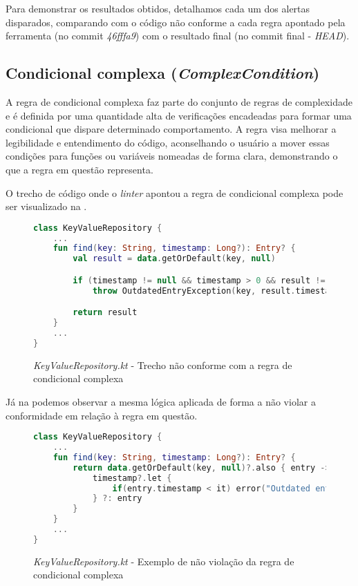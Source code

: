 Para demonstrar os resultados obtidos, detalhamos cada um dos alertas disparados, comparando com o código não conforme a cada regra apontado pela ferramenta (no commit \textit{46fffa9}) com o resultado final (no commit final - \textit{HEAD}).

\subsection{Condicional complexa (\textit{ComplexCondition})}

A regra de condicional complexa faz parte do conjunto de regras de complexidade e é definida por uma quantidade alta de verificações encadeadas para formar uma condicional que dispare determinado comportamento. A regra visa melhorar a legibilidade e entendimento do código, aconselhando o usuário a mover essas condições para funções ou variáveis nomeadas de forma clara, demonstrando o que a regra em questão representa\cite{detekt_complex_condition_rule}.

O trecho de código onde o \textit{linter} apontou a regra de condicional complexa pode ser visualizado na .

\begin{figure}[H]
    \centering
    \begin{lstlisting}[language=Kotlin]
class KeyValueRepository {
    ...
    fun find(key: String, timestamp: Long?): Entry? {
        val result = data.getOrDefault(key, null)

        if (timestamp != null && timestamp > 0 && result != null && result.timestamp < timestamp)
            throw OutdatedEntryException(key, result.timestamp)

        return result
    }
    ...
}
    \end{lstlisting}
    \caption{\textit{KeyValueRepository.kt} - Trecho não conforme com a regra de condicional complexa}
    \label{fig:detekt_complex_condition_before_example}
\end{figure}

Já na  podemos observar a mesma lógica aplicada de forma a não violar a conformidade em relação à regra em questão.

\begin{figure}[H]
    \centering
    \begin{lstlisting}[language=Kotlin]
class KeyValueRepository {
    ...
    fun find(key: String, timestamp: Long?): Entry? {
        return data.getOrDefault(key, null)?.also { entry ->
            timestamp?.let {
                if(entry.timestamp < it) error("Outdated entry found!")
            } ?: entry
        }
    }
    ...
}
    \end{lstlisting}
    \caption{\textit{KeyValueRepository.kt} - Exemplo de não violação da regra de condicional complexa}
    \label{fig:detekt_complex_condition_after_example}
\end{figure}

